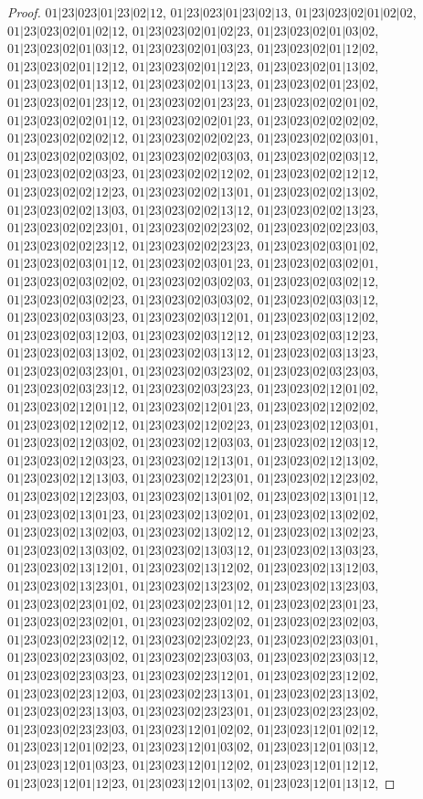 \documentclass[12pt]{article}
\theoremstyle{plain}
\theoremstyle{definition}
\theoremstyle{remark}
\begin{document}
\begin{proof}
$01|23|023|01|23|02|12$, $01|23|023|01|23|02|13$, $01|23|023|02|01|02|02$, $01|23|023|02|01|02|12$, $01|23|023|02|01|02|23$, $01|23|023|02|01|03|02$, $01|23|023|02|01|03|12$, $01|23|023|02|01|03|23$, $01|23|023|02|01|12|02$, $01|23|023|02|01|12|12$, $01|23|023|02|01|12|23$, $01|23|023|02|01|13|02$, $01|23|023|02|01|13|12$, $01|23|023|02|01|13|23$, $01|23|023|02|01|23|02$, $01|23|023|02|01|23|12$, $01|23|023|02|01|23|23$, $01|23|023|02|02|01|02$, $01|23|023|02|02|01|12$, $01|23|023|02|02|01|23$, $01|23|023|02|02|02|02$, $01|23|023|02|02|02|12$, $01|23|023|02|02|02|23$, $01|23|023|02|02|03|01$, $01|23|023|02|02|03|02$, $01|23|023|02|02|03|03$, $01|23|023|02|02|03|12$, $01|23|023|02|02|03|23$, $01|23|023|02|02|12|02$, $01|23|023|02|02|12|12$, $01|23|023|02|02|12|23$, $01|23|023|02|02|13|01$, $01|23|023|02|02|13|02$, $01|23|023|02|02|13|03$, $01|23|023|02|02|13|12$, $01|23|023|02|02|13|23$, $01|23|023|02|02|23|01$, $01|23|023|02|02|23|02$, $01|23|023|02|02|23|03$, $01|23|023|02|02|23|12$, $01|23|023|02|02|23|23$, $01|23|023|02|03|01|02$, $01|23|023|02|03|01|12$, $01|23|023|02|03|01|23$, $01|23|023|02|03|02|01$, $01|23|023|02|03|02|02$, $01|23|023|02|03|02|03$, $01|23|023|02|03|02|12$, $01|23|023|02|03|02|23$, $01|23|023|02|03|03|02$, $01|23|023|02|03|03|12$, $01|23|023|02|03|03|23$, $01|23|023|02|03|12|01$, $01|23|023|02|03|12|02$, $01|23|023|02|03|12|03$, $01|23|023|02|03|12|12$, $01|23|023|02|03|12|23$, $01|23|023|02|03|13|02$, $01|23|023|02|03|13|12$, $01|23|023|02|03|13|23$, $01|23|023|02|03|23|01$, $01|23|023|02|03|23|02$, $01|23|023|02|03|23|03$, $01|23|023|02|03|23|12$, $01|23|023|02|03|23|23$, $01|23|023|02|12|01|02$, $01|23|023|02|12|01|12$, $01|23|023|02|12|01|23$, $01|23|023|02|12|02|02$, $01|23|023|02|12|02|12$, $01|23|023|02|12|02|23$, $01|23|023|02|12|03|01$, $01|23|023|02|12|03|02$, $01|23|023|02|12|03|03$, $01|23|023|02|12|03|12$, $01|23|023|02|12|03|23$, $01|23|023|02|12|13|01$, $01|23|023|02|12|13|02$, $01|23|023|02|12|13|03$, $01|23|023|02|12|23|01$, $01|23|023|02|12|23|02$, $01|23|023|02|12|23|03$, $01|23|023|02|13|01|02$, $01|23|023|02|13|01|12$, $01|23|023|02|13|01|23$, $01|23|023|02|13|02|01$, $01|23|023|02|13|02|02$, $01|23|023|02|13|02|03$, $01|23|023|02|13|02|12$, $01|23|023|02|13|02|23$, $01|23|023|02|13|03|02$, $01|23|023|02|13|03|12$, $01|23|023|02|13|03|23$, $01|23|023|02|13|12|01$, $01|23|023|02|13|12|02$, $01|23|023|02|13|12|03$, $01|23|023|02|13|23|01$, $01|23|023|02|13|23|02$, $01|23|023|02|13|23|03$, $01|23|023|02|23|01|02$, $01|23|023|02|23|01|12$, $01|23|023|02|23|01|23$, $01|23|023|02|23|02|01$, $01|23|023|02|23|02|02$, $01|23|023|02|23|02|03$, $01|23|023|02|23|02|12$, $01|23|023|02|23|02|23$, $01|23|023|02|23|03|01$, $01|23|023|02|23|03|02$, $01|23|023|02|23|03|03$, $01|23|023|02|23|03|12$, $01|23|023|02|23|03|23$, $01|23|023|02|23|12|01$, $01|23|023|02|23|12|02$, $01|23|023|02|23|12|03$, $01|23|023|02|23|13|01$, $01|23|023|02|23|13|02$, $01|23|023|02|23|13|03$, $01|23|023|02|23|23|01$, $01|23|023|02|23|23|02$, $01|23|023|02|23|23|03$, $01|23|023|12|01|02|02$, $01|23|023|12|01|02|12$, $01|23|023|12|01|02|23$, $01|23|023|12|01|03|02$, $01|23|023|12|01|03|12$, $01|23|023|12|01|03|23$, $01|23|023|12|01|12|02$, $01|23|023|12|01|12|12$, $01|23|023|12|01|12|23$, $01|23|023|12|01|13|02$, $01|23|023|12|01|13|12$, 
\end{proof}
\end{document}
